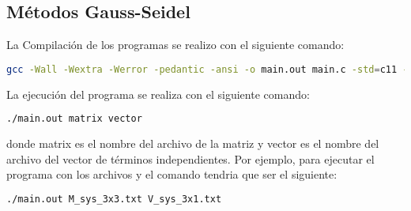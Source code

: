 \subsection{Métodos Gauss-Seidel}

La Compilación de los programas se realizo con el siguiente comando:

\begin{lstlisting}[language=bash]
    gcc -Wall -Wextra -Werror -pedantic -ansi -o main.out main.c -std=c11 -lm
\end{lstlisting}

La ejecución del programa se realiza con el siguiente comando:

\begin{lstlisting}[language=bash]
    ./main.out matrix vector
\end{lstlisting}

donde matrix es el nombre del archivo de la matriz y vector es el nombre del archivo del vector de términos independientes. Por ejemplo, para ejecutar el programa con los archivos  y  el comando tendria que ser el siguiente:

\begin{lstlisting}[language=bash]
    ./main.out M_sys_3x3.txt V_sys_3x1.txt
\end{lstlisting}